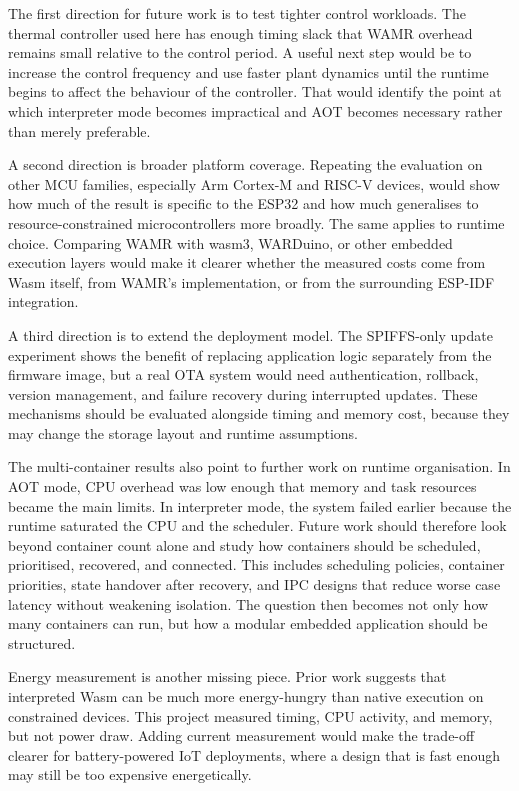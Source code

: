 \documentclass[12pt, a4paper]{report}
\begin{document}
The first direction for future work is to test tighter control workloads. The thermal controller used here has enough timing slack that WAMR overhead remains small relative to the control period. A useful next step would be to increase the control frequency and use faster plant dynamics until the runtime begins to affect the behaviour of the controller. That would identify the point at which interpreter mode becomes impractical and AOT becomes necessary rather than merely preferable.

A second direction is broader platform coverage. Repeating the evaluation on other MCU families, especially Arm Cortex-M and RISC-V devices, would show how much of the result is specific to the ESP32 and how much generalises to resource-constrained microcontrollers more broadly. The same applies to runtime choice. Comparing WAMR with wasm3, WARDuino, or other embedded execution layers would make it clearer whether the measured costs come from Wasm itself, from WAMR's implementation, or from the surrounding ESP-IDF integration.

A third direction is to extend the deployment model. The SPIFFS-only update experiment shows the benefit of replacing application logic separately from the firmware image, but a real OTA system would need authentication, rollback, version management, and failure recovery during interrupted updates. These mechanisms should be evaluated alongside timing and memory cost, because they may change the storage layout and runtime assumptions.

The multi-container results also point to further work on runtime organisation. In AOT mode, CPU overhead was low enough that memory and task resources became the main limits. In interpreter mode, the system failed earlier because the runtime saturated the CPU and the scheduler. Future work should therefore look beyond container count alone and study how containers should be scheduled, prioritised, recovered, and connected. This includes scheduling policies, container priorities, state handover after recovery, and IPC designs that reduce worse case latency without weakening isolation. The question then becomes not only how many containers can run, but how a modular embedded application should be structured.

Energy measurement is another missing piece. Prior work suggests that interpreted Wasm can be much more energy-hungry than native execution on constrained devices. This project measured timing, CPU activity, and memory, but not power draw. Adding current measurement would make the trade-off clearer for battery-powered IoT deployments, where a design that is fast enough may still be too expensive energetically.
\end{document}
